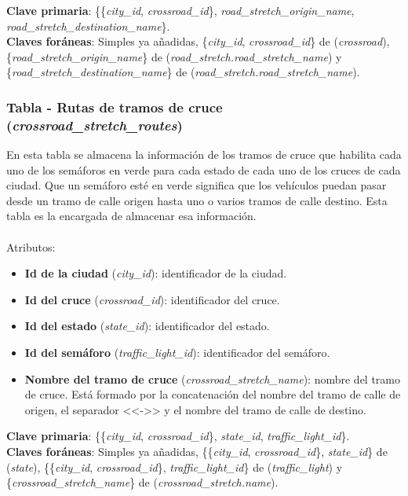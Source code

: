 \textbf{Clave primaria}: \{\{\textit{city\_id}, \textit{crossroad\_id}\}, \textit{road\_stretch\_origin\_name}, \newline \textit{road\_stretch\_destination\_name}\}. \\
\textbf{Claves foráneas}: Simples ya añadidas, \{\textit{city\_id}, \textit{crossroad\_id}\} de (\textit{crossroad}), \{\textit{road\_stretch\_origin\_name}\} de (\textit{road\_stretch.road\_stretch\_name}) \newline y \{\textit{road\_stretch\_destination\_name}\} de (\textit{road\_stretch.road\_stretch\_name}).

\subsubsection{Tabla - Rutas de tramos de cruce (\textit{crossroad\_stretch\_routes})}
En esta tabla se almacena la información de los tramos de cruce que habilita cada uno de los semáforos en verde para cada estado de cada uno de los cruces de cada ciudad. Que un semáforo esté en verde significa que los vehículos puedan pasar desde un tramo de calle origen hasta uno o varios tramos de calle destino. Esta tabla es la encargada de almacenar esa información. \\\\
Atributos:
\begin{itemize}
    \item \textbf{Id de la ciudad} (\textit{city\_id}): identificador de la ciudad.
    \item \textbf{Id del cruce} (\textit{crossroad\_id}): identificador del cruce.
    \item \textbf{Id del estado} (\textit{state\_id}): identificador del estado.
    \item \textbf{Id del semáforo} (\textit{traffic\_light\_id}): identificador del semáforo.
    \item \textbf{Nombre del tramo de cruce} (\textit{crossroad\_stretch\_name}): nombre del tramo de cruce. Está formado por la concatenación del nombre del tramo de calle de origen, el separador <<->> y el nombre del tramo de calle de destino.
\end{itemize}
\textbf{Clave primaria}: \{\{\textit{city\_id}, \textit{crossroad\_id}\}, \textit{state\_id}, \textit{traffic\_light\_id}\}. \\
\textbf{Claves foráneas}: Simples ya añadidas, \{\{\textit{city\_id}, \textit{crossroad\_id}\}, \textit{state\_id}\} de (\textit{state}), \{\{\textit{city\_id}, \textit{crossroad\_id}\}, \textit{traffic\_light\_id}\} de (\textit{traffic\_light}) y \newline \{\textit{crossroad\_stretch\_name}\} de (\textit{crossroad\_stretch.name}).

